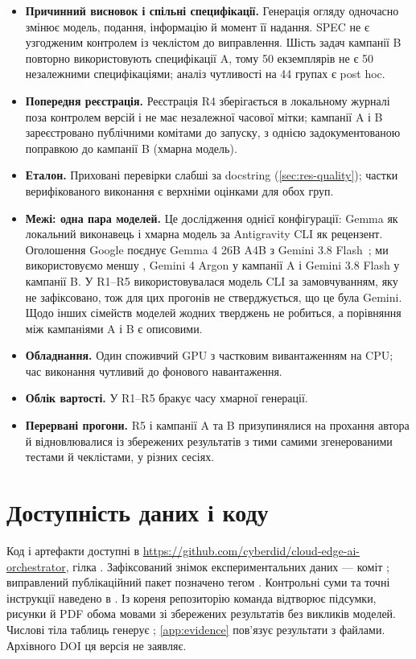 \documentclass[11pt]{article}
\begin{document}
\begin{itemize}
\item \textbf{Причинний висновок і спільні специфікації.} Генерація огляду одночасно змінює модель, подання, інформацію й момент її надання. SPEC не є узгодженим контролем із чеклістом до виправлення. Шість задач кампанії B повторно використовують специфікації A, тому 50 екземплярів не є 50 незалежними специфікаціями; аналіз чутливості на 44 групах є post hoc.
\item \textbf{Попередня реєстрація.} Реєстрація R4 зберігається в локальному журналі поза контролем версій і не має незалежної часової мітки; кампанії A і B зареєстровано публічними комітами до запуску, з однією задокументованою поправкою до кампанії B (хмарна модель).
\item \textbf{Еталон.} Приховані перевірки слабші за docstring (\cref{sec:res-quality}); частки верифікованого виконання є верхніми оцінками для обох груп.
\item \textbf{Межі: одна пара моделей.} Це дослідження однієї конфігурації: Gemma як локальний виконавець і хмарна модель за Antigravity CLI як рецензент. Оголошення Google поєднує Gemma 4 26B A4B з Gemini 3.8 Flash~\citep{kotwani2026antigravity}; ми використовуємо меншу , Gemini 4 Argon у кампанії A і Gemini 3.8 Flash у кампанії B. У R1--R5 використовувалася модель CLI за замовчуванням, яку не зафіксовано, тож для цих прогонів не стверджується, що це була Gemini. Щодо інших сімейств моделей жодних тверджень не робиться, а порівняння між кампаніями A і B є описовими.
\item \textbf{Обладнання.} Один споживчий GPU з частковим вивантаженням на CPU; час виконання чутливий до фонового навантаження.
\item \textbf{Облік вартості.} У R1--R5 бракує часу хмарної генерації.
\item \textbf{Перервані прогони.} R5 і кампанії A та B призупинялися на прохання автора й відновлювалися із збережених результатів з тими самими згенерованими тестами й чеклістами, у різних сесіях.
\end{itemize}

\section{Доступність даних і коду}\label{sec:availability}
Код і артефакти доступні в \url{https://github.com/cyberdid/cloud-edge-ai-orchestrator}, гілка . Зафіксований знімок експериментальних даних --- коміт ; виправлений публікаційний пакет позначено тегом . Контрольні суми та точні інструкції наведено в . Із кореня репозиторію команда  відтворює підсумки, рисунки й PDF обома мовами зі збережених результатів без викликів моделей. Числові тіла таблиць генерує ; \cref{app:evidence} пов'язує результати з файлами. Архівного DOI ця версія не заявляє.
\end{document}
